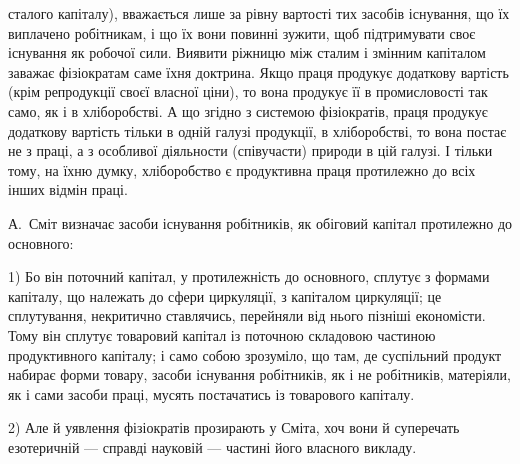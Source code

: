 \parcont{}  %
сталого капіталу), вважається лише за рівну вартості тих засобів існування,
що їх виплачено робітникам, і що їх вони повинні зужити, щоб
підтримувати своє існування як робочої сили. Виявити ріжницю між сталим
і змінним капіталом заважає фізіократам саме їхня доктрина. Якщо
праця продукує додаткову вартість (крім репродукції своєї власної ціни),
то вона продукує її в промисловості так само, як і в хліборобстві. А
що згідно з системою фізіократів, праця продукує додаткову вартість
тільки в одній галузі продукції, в хліборобстві, то вона постає не з праці,
а з особливої діяльности (співучасти) природи в цій галузі. І тільки
тому, на їхню думку, хліборобство є продуктивна праця протилежно до
всіх інших відмін праці.

А.~Сміт визначає засоби існування робітників, як обіговий капітал
протилежно до основного:

1) Бо він поточний капітал, у протилежність до основного, сплутує
з формами капіталу, що належать до сфери циркуляції, з капіталом
циркуляції; це сплутування, некритично ставлячись, перейняли від нього
пізніші економісти. Тому він сплутує товаровий капітал із поточною
складовою частиною продуктивного капіталу; і само собою зрозуміло,
що там, де суспільний продукт набирає форми товару, засоби існування
робітників, як і не робітників, матеріяли, як і сами засоби праці, мусять
постачатись із товарового капіталу.

2) Але й уявлення фізіократів прозирають у Сміта, хоч вони й суперечать
езотеричній — справді науковій — частині його власного викладу.

